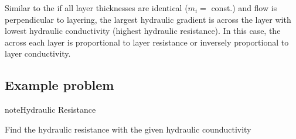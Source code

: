 \documentclass[letterpaper,10pt,english]{jupyterBook}
\begin{document}
\sphinxAtStartPar
Similar to the  if all layer thicknesses are identical (\(m_i =\) const.) and flow is perpendicular to layering, the largest hydraulic gradient is across the layer with lowest hydraulic conductivity (highest hydraulic resistance). In this case, the  across each layer is proportional to layer resistance or inversely proportional to layer conductivity.


\subsection{Example problem}
\label{\detokenize{content/flow/L5/15_het_iso:id2}}
\begin{sphinxadmonition}{note}{Hydraulic Resistance}

\sphinxAtStartPar
Find the hydraulic resistance with the given hydraulic counductivity
\end{sphinxadmonition}
\end{document}
